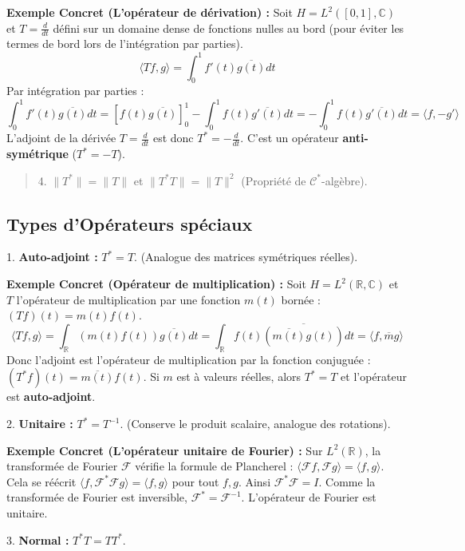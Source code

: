 \documentclass[11pt,a4paper]{article}
\begin{document}
\textbf{Exemple Concret (L'opérateur de dérivation) :}
Soit $H = L^2([0, 1], \mathbb{C})$ et $T = \frac{d}{dt}$ défini sur un domaine dense de fonctions nulles au bord (pour éviter les termes de bord lors de l'intégration par parties).
$$\langle Tf, g \rangle = \int_0^1 f'(t) \overline{g(t)} dt$$
Par intégration par parties :
$$\int_0^1 f'(t) \overline{g(t)} dt = [f(t)\overline{g(t)}]_0^1 - \int_0^1 f(t) \overline{g'(t)} dt = - \int_0^1 f(t) \overline{g'(t)} dt = \langle f, -g' \rangle$$
L'adjoint de la dérivée $T = \frac{d}{dt}$ est donc $T^* = -\frac{d}{dt}$. C'est un opérateur \textbf{anti-symétrique} ($T^* = -T$).

\begin{quote}
4. $\|T^*\| = \|T\|$ et $\|T^* T\| = \|T\|^2$ (Propriété de $\mathcal{C}^*$-algèbre).
\end{quote}

\subsection{Types d'Opérateurs spéciaux}

1. \textbf{Auto-adjoint :} $T^* = T$. (Analogue des matrices symétriques réelles).


\textbf{Exemple Concret (Opérateur de multiplication) :}
Soit $H = L^2(\mathbb{R}, \mathbb{C})$ et $T$ l'opérateur de multiplication par une fonction $m(t)$ bornée : $(Tf)(t) = m(t)f(t)$.
$$\langle Tf, g \rangle = \int_\mathbb{R} (m(t)f(t)) \overline{g(t)} dt = \int_\mathbb{R} f(t) \overline{(\overline{m(t)}g(t))} dt = \langle f, \overline{m}g \rangle$$
Donc l'adjoint est l'opérateur de multiplication par la fonction conjuguée : $(T^*f)(t) = \overline{m(t)}f(t)$.
Si $m$ est à valeurs réelles, alors $T^* = T$ et l'opérateur est \textbf{auto-adjoint}.

2. \textbf{Unitaire :} $T^* = T^{-1}$. (Conserve le produit scalaire, analogue des rotations).


\textbf{Exemple Concret (L'opérateur unitaire de Fourier) :}
Sur $L^2(\mathbb{R})$, la transformée de Fourier $\mathcal{F}$ vérifie la formule de Plancherel : $\langle \mathcal{F}f, \mathcal{F}g \rangle = \langle f, g \rangle$.
Cela se réécrit $\langle f, \mathcal{F}^* \mathcal{F} g \rangle = \langle f, g \rangle$ pour tout $f, g$.
Ainsi $\mathcal{F}^* \mathcal{F} = I$. Comme la transformée de Fourier est inversible, $\mathcal{F}^* = \mathcal{F}^{-1}$. L'opérateur de Fourier est unitaire.

3. \textbf{Normal :} $T^* T = T T^*$.
\end{document}
